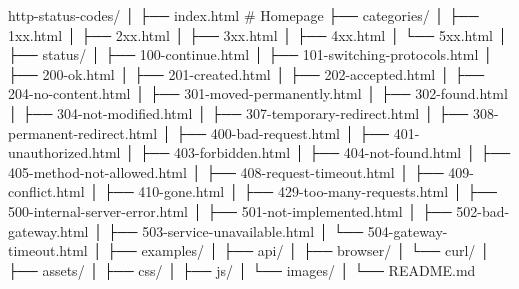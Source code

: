 http-status-codes/
│
├── index.html                 # Homepage
├── categories/
│   ├── 1xx.html
│   ├── 2xx.html
│   ├── 3xx.html
│   ├── 4xx.html
│   └── 5xx.html
│
├── status/
│   ├── 100-continue.html
│   ├── 101-switching-protocols.html
│   ├── 200-ok.html
│   ├── 201-created.html
│   ├── 202-accepted.html
│   ├── 204-no-content.html
│   ├── 301-moved-permanently.html
│   ├── 302-found.html
│   ├── 304-not-modified.html
│   ├── 307-temporary-redirect.html
│   ├── 308-permanent-redirect.html
│   ├── 400-bad-request.html
│   ├── 401-unauthorized.html
│   ├── 403-forbidden.html
│   ├── 404-not-found.html
│   ├── 405-method-not-allowed.html
│   ├── 408-request-timeout.html
│   ├── 409-conflict.html
│   ├── 410-gone.html
│   ├── 429-too-many-requests.html
│   ├── 500-internal-server-error.html
│   ├── 501-not-implemented.html
│   ├── 502-bad-gateway.html
│   ├── 503-service-unavailable.html
│   └── 504-gateway-timeout.html
│
├── examples/
│   ├── api/
│   ├── browser/
│   └── curl/
│
├── assets/
│   ├── css/
│   ├── js/
│   └── images/
│
└── README.md
